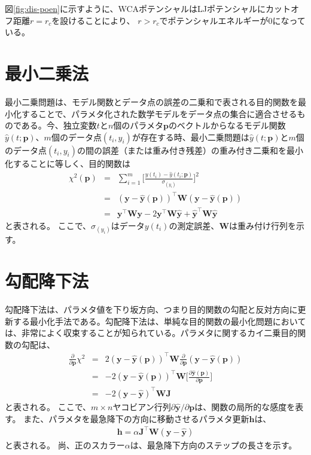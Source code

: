 \documentclass[titlepage]{jsreport}
\begin{document}
図\ref{fig:dis-poen}に示すように、WCAポテンシャルはLJポテンシャルにカットオフ距離$r=r_c$を設けることにより、
$r>r_c$でポテンシャルエネルギーが0になっている。


\section{最小二乗法}\label{principle-sec:least-squares}
最小二乗問題は、モデル関数とデータ点の誤差の二乗和で表される目的関数を最小化することで、パラメタ化された数学モデルをデータ点の集合に適合させるものである。今、独立変数$t$と$n$個のパラメタ$\bm{p}$のベクトルからなるモデル関数$\hat{y}(t;\bm{p})$、$m$個のデータ点$(t_i, y_i)$が存在する時、最小二乗問題は$\hat{y}(t;\bm{p})$と$m$個のデータ点$(t_i, y_i)$の間の誤差（または重み付き残差）の重み付き二乗和を最小化することに等しく、目的関数は
\large
\begin{eqnarray}
\chi^2(\bm{p}) &=& \sum_{i=1}^{m}\Bigg[\frac{y(t_i)-\hat{y}(t_i;\bm{p})}{\sigma_(y_i)}\Bigg]^2 \nonumber\\
               &=& (\bm{y}-\hat{\bm{y}}(\bm{p}))^\top\bm{W}(\bm{y}-\hat{\bm{y}}(\bm{p})) \nonumber\\
               &=& \bm{y}^\top\bm{W}\bm{y}-2\bm{y}^\top\bm{W}\hat{\bm{y}}+\hat{\bm{y}}^\top\bm{W}\hat{\bm{y}} \label{eq:queue-residual-error}
\end{eqnarray}
\normalsize
と表される。
ここで、$\sigma_(y_i)$はデータ$y(t_i)$の測定誤差、$\bm{W}$は重み付け行列を示す\cite{gradient-descent_gauss-newton_levenberg-marquardt}。


\section{勾配降下法}\label{principle-sec:gradient-descent}
勾配降下法は、パラメタ値を下り坂方向、つまり目的関数の勾配と反対方向に更新する最小化手法である。勾配降下法は、単純な目的関数の最小化問題においては、非常によく収束することが知られている\cite{gradient-descent}。パラメタに関するカイ二乗目的関数の勾配は、
\large
\begin{eqnarray}
\frac{\partial}{\partial\bm{p}}\chi^2 &=& 2(\bm{y}-\hat{\bm{y}}(\bm{p}))^\top\bm{W}\frac{\partial}{\partial\bm{p}}(\bm{y}-\hat{\bm{y}}(\bm{p})) \nonumber\\
                                      &=& -2(\bm{y}-\hat{\bm{y}}(\bm{p}))^\top\bm{W}\Bigg[\frac{\partial\hat{\bm{y}}(\bm{p})}{\partial\bm{p}}\Bigg] \nonumber\\
                                      &=& -2(\bm{y}-\hat{\bm{y}})^\top\bm{W}\bm{J} \label{eq:gradient-of-the-chi-square-objective-function}
\end{eqnarray}
\normalsize
と表される。
ここで、$m×n$ヤコビアン行列$\partial\hat{\bm{y}}/{\partial\bm{p}}$は、関数の局所的な感度を表す。
また、パラメタを最急降下の方向に移動させるパラメタ更新$\bm{h}$は、
\large
\begin{eqnarray}
\bm{h} = \alpha\bm{J}^\top\bm{W}(\bm{y}-\hat{\bm{y}})
\end{eqnarray}
\normalsize
と表される\cite{gradient-descent_gauss-newton_levenberg-marquardt}。
尚、正のスカラー$\alpha$は、最急降下方向のステップの長さを示す。
\end{document}
